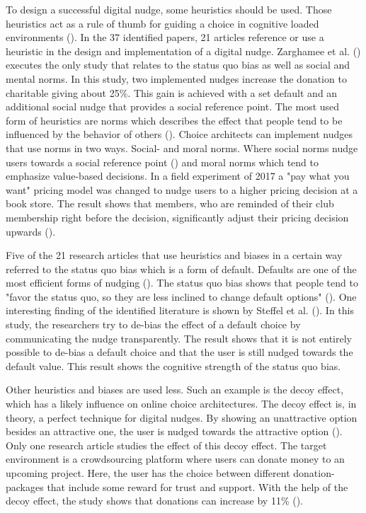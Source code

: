 To design a successful digital nudge, some heuristics should be used. Those heuristics act as a rule of thumb for guiding a choice in cognitive loaded environments (\cite{thaler_nudge:_2009}). In the 37 identified papers, 21 articles reference or use a heuristic in the design and implementation of a digital nudge. Zarghamee et al. (\citeyear{zarghamee_nudging_2017}) executes the only study that relates to the status quo bias as well as social and mental norms. In this study, two implemented nudges increase the donation to charitable giving about 25\%. This gain is achieved with a set default and an additional social nudge that provides a social reference point.
The most used form of heuristics are norms which describes the effect that people tend to be influenced by the behavior of others (\cite{schneider_digital_2018}). Choice architects can implement nudges that use norms in two ways. Social- and moral norms. Where social norms nudge users towards a social reference point (\cite{wang_socially_2018}) and moral norms which tend to emphasize value-based decisions. In a field experiment of 2017 a "pay what you want" pricing model was changed to nudge users to a higher pricing decision at a book store. The result shows that members, who are reminded of their club membership right before the decision, significantly adjust their pricing decision upwards (\cite{gravert_pride_2017}).

Five of the 21 research articles that use heuristics and biases in a certain way referred to the status quo bias which is a form of default. Defaults are one of the most efficient forms of nudging (\cite{johnson_defaults_2003}). The status quo bias shows that people tend to "favor the status quo, so they are less inclined to change default options" (\cite[p.71]{schneider_digital_2018}). One interesting finding of the identified literature is shown by Steffel et al. (\citeyear{steffel_ethically_2016}). In this study, the researchers try to de-bias the effect of a default choice by communicating the nudge transparently. The result shows that it is not entirely possible to de-bias a default choice and that the user is still nudged towards the default value. This result shows the cognitive strength of the status quo bias.

Other heuristics and biases are used less. Such an example is the decoy effect, which has a likely influence on online choice architectures. The decoy effect is, in theory, a perfect technique for digital nudges. By showing an unattractive option besides an attractive one, the user is nudged towards the attractive option (\cite{schneider_digital_2018}). Only one research article studies the effect of this decoy effect. The target environment is a crowdsourcing platform where users can donate money to an upcoming project. Here, the user has the choice between different donation-packages that include some reward for trust and support. With the help of the decoy effect, the study shows that donations can increase by 11\% (\cite{tietz_decoy_2016}).


